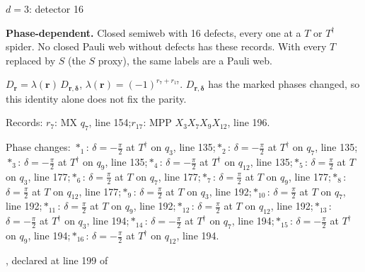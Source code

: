 \label{d3_det016}
{\Large $d=3$: detector 16}\par
\textbf{Phase-dependent.} Closed semiweb with 16 defects, every one at a $T$ or $T^\dagger$ spider. No closed Pauli web without defects has these records. With every $T$ replaced by $S$ (the $S$ proxy), the same labels are a Pauli web.
\begin{center}
\end{center}
\vspace{-1mm}
$D_{\boldsymbol r}=\lambda(\boldsymbol r)\,D_{\boldsymbol r,\boldsymbol\delta}$, \quad $\lambda(\boldsymbol r)=(-1)^{r_{7}+r_{17}}$. \qquad $D_{\boldsymbol r,\boldsymbol\delta}$ has the marked phases changed, so this identity alone does not fix the parity.
\par\smallskip\begin{minipage}{.98\linewidth}\small Records: $r_{7}$: MX $q_{7}$, line 154;\quad $r_{17}$: MPP $X_{3}X_{7}X_{9}X_{12}$, line 196.\end{minipage}
\par\smallskip\begin{minipage}{.98\linewidth}\small Phase changes: $\ast_{1}$: $\delta=-\frac{\pi}{2}$ at $T^\dagger$ on $q_{3}$, line 135;\quad $\ast_{2}$: $\delta=-\frac{\pi}{2}$ at $T^\dagger$ on $q_{7}$, line 135;\quad $\ast_{3}$: $\delta=-\frac{\pi}{2}$ at $T^\dagger$ on $q_{9}$, line 135;\quad $\ast_{4}$: $\delta=-\frac{\pi}{2}$ at $T^\dagger$ on $q_{12}$, line 135;\quad $\ast_{5}$: $\delta=\frac{\pi}{2}$ at $T$ on $q_{3}$, line 177;\quad $\ast_{6}$: $\delta=\frac{\pi}{2}$ at $T$ on $q_{7}$, line 177;\quad $\ast_{7}$: $\delta=\frac{\pi}{2}$ at $T$ on $q_{9}$, line 177;\quad $\ast_{8}$: $\delta=\frac{\pi}{2}$ at $T$ on $q_{12}$, line 177;\quad $\ast_{9}$: $\delta=\frac{\pi}{2}$ at $T$ on $q_{3}$, line 192;\quad $\ast_{10}$: $\delta=\frac{\pi}{2}$ at $T$ on $q_{7}$, line 192;\quad $\ast_{11}$: $\delta=\frac{\pi}{2}$ at $T$ on $q_{9}$, line 192;\quad $\ast_{12}$: $\delta=\frac{\pi}{2}$ at $T$ on $q_{12}$, line 192;\quad $\ast_{13}$: $\delta=-\frac{\pi}{2}$ at $T^\dagger$ on $q_{3}$, line 194;\quad $\ast_{14}$: $\delta=-\frac{\pi}{2}$ at $T^\dagger$ on $q_{7}$, line 194;\quad $\ast_{15}$: $\delta=-\frac{\pi}{2}$ at $T^\dagger$ on $q_{9}$, line 194;\quad $\ast_{16}$: $\delta=-\frac{\pi}{2}$ at $T^\dagger$ on $q_{12}$, line 194.\end{minipage}
\vfill
{\footnotesize\texttt{}, declared at line 199 of \texttt{}}
\newpage

